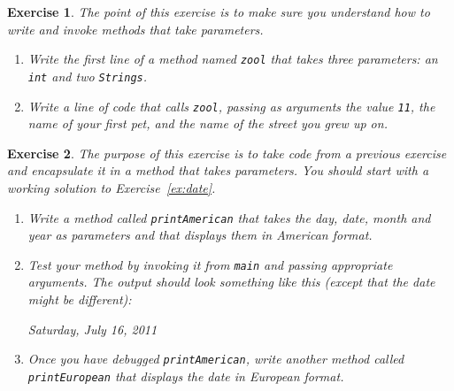 \documentclass[12pt]{book}
\theoremstyle{exercise}
\newtheorem{exercise}{Exercise}[chapter]
\newcommand{\java}[1]{\verb"#1"}
\begin{document}






\begin{exercise}

The point of this exercise is to make sure you understand how to write and invoke methods that take parameters.

\begin{enumerate}
\item Write the first line of a method named \java{zool} that takes three parameters: an \java{int} and two \java{Strings}.

\item Write a line of code that calls \java{zool}, passing as arguments the value \java{11}, the name of your first pet, and the name of the street you grew up on.
\end{enumerate}

\end{exercise}


\begin{exercise}

The purpose of this exercise is to take code from a previous exercise and encapsulate it in a method that takes parameters.
You should start with a working solution to Exercise~\ref{ex:date}.

\begin{enumerate}

\item Write a method called \java{printAmerican} that takes the day, date, month and year as parameters and that displays them in American format.

\item Test your method by invoking it from \java{main} and passing appropriate arguments.
The output should look something like this (except that the date might be different):

\begin{stdout}
Saturday, July 16, 2011
\end{stdout}

\item Once you have debugged \java{printAmerican}, write another method called \java{printEuropean} that displays the date in European format.

\end{enumerate}

\end{exercise}
\end{document}
